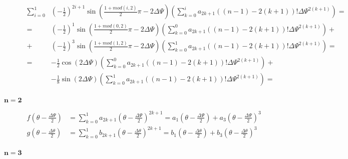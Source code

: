 \documentclass[review]{elsarticle}
\begin{document}
\begin{description}
\begin{equation}
\begin{aligned}
\sum_{i=0}^{1}&\left(-\frac{1}{2}\right)^{2i+1}\sin\left(\frac{1+mod\left(i,2\right)}{2}\pi-2\Delta\Psi\right)\left(\sum_{k=0}^{i}a_{2k+1}\left(\left(n-1\right)-2\left(k+1\right)\right)!\Delta\Psi^{2\left(k+1\right)}\right)=\\
=&\left(-\frac{1}{2}\right)^{1}\sin\left(\frac{1+mod\left(0,2\right)}{2}\pi-2\Delta\Psi\right)\left(\sum_{k=0}^{0}a_{2k+1}\left(\left(n-1\right)-2\left(k+1\right)\right)!\Delta\Psi^{2\left(k+1\right)}\right)+\\
+&\left(-\frac{1}{2}\right)^{3}\sin\left(\frac{1+mod\left(1,2\right)}{2}\pi-2\Delta\Psi\right)\left(\sum_{k=0}^{1}a_{2k+1}\left(\left(n-1\right)-2\left(k+1\right)\right)!\Delta\Psi^{2\left(k+1\right)}\right)=\\
=&-\frac{1}{2}\cos\left(2\Delta\Psi\right)\left(\sum_{k=0}^{0}a_{2k+1}\left(\left(n-1\right)-2\left(k+1\right)\right)!\Delta\Psi^{2\left(k+1\right)}\right)+\\
&-\frac{1}{8}\sin\left(2\Delta\Psi\right)\left(\sum_{k=0}^{1}a_{2k+1}\left(\left(n-1\right)-2\left(k+1\right)\right)!\Delta\Psi^{2\left(k+1\right)}\right)=\\
\end{aligned}
\end{equation}

\item[$\mathbf{n=2}$]

\begin{equation}
\begin{aligned}
f\left(\theta-\frac{\Delta\Psi}{2}\right)&=\sum_{k=0}^{1}a_{2k+1}\left(\theta-\frac{\Delta\Psi}{2}\right)^{2k+1}=a_{1}\left(\theta-\frac{\Delta\Psi}{2}\right)+a_{3}\left(\theta-\frac{\Delta\Psi}{2}\right)^{3}\\
g\left(\theta-\frac{\Delta\theta}{2}\right)&=\sum_{k=0}^{1}b_{2k+1}\left(\theta-\frac{\Delta\theta}{2}\right)^{2k+1}=b_{1}\left(\theta-\frac{\Delta\theta}{2}\right)+b_{3}\left(\theta-\frac{\Delta\theta}{2}\right)^{3}\\
\end{aligned}
\end{equation}

\item[$\mathbf{n=3}$]


\end{description}
\end{document}
